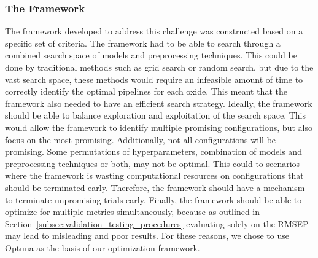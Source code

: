 \subsubsection{The Framework}
The framework developed to address this challenge was constructed based on a specific set of criteria.
The framework had to be able to search through a combined search space of models and preprocessing techniques.
This could be done by traditional methods such as grid search or random search, but due to the vast search space, these methods would require an infeasible amount of time to correctly identify the optimal pipelines for each oxide.
This meant that the framework also needed to have an efficient search strategy.
Ideally, the framework should be able to balance exploration and exploitation of the search space.
This would allow the framework to identify multiple promising configurations, but also focus on the most promising.
Additionally, not all configurations will be promising. 
Some permutations of hyperparameters, combination of models and preprocessing techniques or both, may not be optimal.
This could to scenarios where the framework is wasting computational resources on configurations that should be terminated early.
Therefore, the framework should have a mechanism to terminate unpromising trials early.
Finally, the framework should be able to optimize for multiple metrics simultaneously, because as outlined in Section~\ref{subsec:validation_testing_procedures} evaluating solely on the RMSEP may lead to misleading and poor results.
For these reasons, we chose to use Optuna as the basis of our optimization framework.

